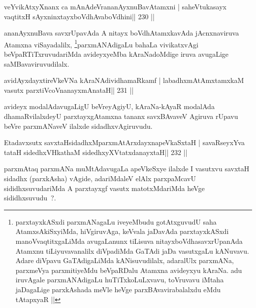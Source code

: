 \begin{shl}
veYvikAtxyXnanx ca mAnAdeVrananAyxnuBavAtamxni |
saheVtukasayx vaqtitxH sAyxninxtayxboVdhAvaboVdhini\hfill || 230 ||
\end{shl}

\begin{artha}
ananAyxnuBava savxrUpavAda A nitayx boVdhAtamxkavAda jAcnxnaviruva
Atamxna viSayadalilx, \footnote[2]{parxtayxkASxdi parxmANagaLu
  iveyeMbudu gotAtxguvudU saha AtamxsAkiSxyiMda, hiVgiruvAga, keVvala
jaDavAda parxtayxkASxdi manoVvaqtitxgaLiMda avugaLanunx tiLisuva
nitayxboVdhasavxrUpanAda Atamxnu tiLiyuvavanalilx diVpadiMda GaTAdi
jaDa vasutxgaLu kANuvavu. Adare diVpavu GaTAdigaLiMda kANisuvudilalx,
adaralUlx parxmANa, parxmeVya parxmitiyeMdu beVpaRDalu Atamxna
avideyxyu kAraNa. adu iruvAgale parxmANAdigaLu huTiTxkoLuLxvavu,
toVruvavu iMtaha jaDagaLige parxkAshada meVle heVge 
parxBAvavirabalalxdu eMdu tAtapxyaR ||}parxmANAdigaLu bahaLa vivikatxvAgi
beVpaRTiTxruvudariMda avideyxyeMba kAraNadoMdige iruva avugaLige
saMBavaviruvudilalx.
\end{artha}


\begin{shl}
avidAyxdayxtireVkeVNa kAraNAdividhamaRkamf |
labadhxmAtAmxtamxkaM vasutx parxtiVcoV\s nanayxmAnataH\hfill || 231 ||
\end{shl}

\begin{artha}
avideyx modalAdavugaLigU beVreyAgiyU, kAraNa-kAyaR modalAda dhamaRvilalxdeyU parxtayxgAtamxna tananx savxBAvaveV Agiruva rUpavu beVre parxmANaveV ilalxde sidadhxvAgiruvudu.
\end{artha}

\begin{shl}
Etadavxsutx savxtaHsidadhxM\footnotemark[1] parxmAtArxdayxnapeVkaSxtaH |
savaRseyxYva tataH sidedhxVH\footnotemark[1] kathaM sidedhxyXVtatxdanayxtaH\hfill || 232 ||
\end{shl}

\begin{artha}
parxmAtaq parxmANa muMtAdavugaLa apeVkeSxye ilalxde I vasutxvu savxtaH sidadhx (parxkAsha) vAgide, adariMdaleV elAlx parxpaMcavU sididhxsuvudariMda A parxtayxgf vasutx matotxMdariMda heVge sididhxsuvudu~?.
\end{artha}

